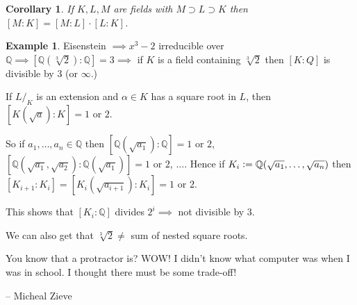 \documentclass{article}
\newcommand{\Q}{\mathbb{Q}}
\newcommand{\defeq}{\vcentcolon=}
\newtheorem*{corollary}{Corollary}
\theoremstyle{definition}
\newtheorem*{example}{Example}
\theoremstyle{remark}
\begin{document}
\begin{corollary}
  If $K, L, M$ are fields with $M \supset L \supset K$ then $[M: K] = [M: L]\cdot[L:K]$.
\end{corollary}

\begin{example}
  Eisenstein $\implies x^3 - 2$ irreducible over $\Q \implies [\Q(\sqrt[3]{2}): \Q] = 3 \implies$ if $K$ is a field containing $\sqrt[3]{2}$ then $[K: Q]$ is divisible by $3$ (or $\infty$.)

  If $L/_K$ is an extension and $\alpha \in K$ has a square root in $L$, then $[K(\sqrt{a}): K] = 1$ or $2$.

  So if $a_1, \ldots, a_n \in \Q$ then $[\Q(\sqrt{a_1}): \Q] = 1$ or $2$, $[\Q(\sqrt{a_1}, \sqrt{a_2}): \Q(\sqrt{a_1})] = 1$ or $2$, $\ldots$. Hence if $K_i \defeq \Q(\sqrt{a_1}, \ldots, \sqrt{a_n})$ then $[K_{i+1}: K_i] = [K_i(\sqrt{a_{i+1}}):K_i] = 1$ or $2$.

  This shows that $[K_i: \Q]$ divides $2^i \implies$ not divisible by $3$.

  We can also get that $\sqrt[3]{2} \neq$ sum of nested square roots.
\end{example}

\epigraph{You know that a protractor is? WOW! I didn't know what computer was when I was in school. I thought there must be some trade-off!}{-- \textup{Micheal Zieve}}
\end{document}

